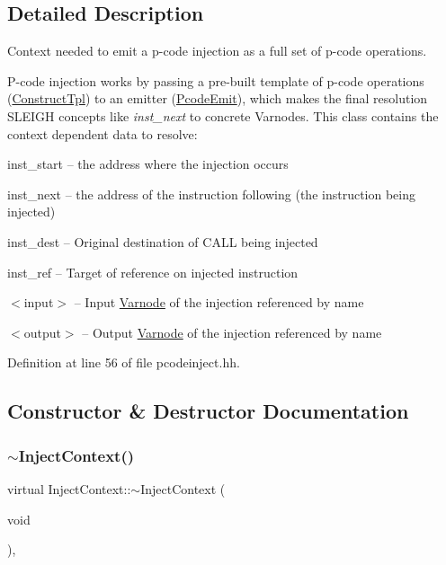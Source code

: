 \subsection{Detailed Description}
Context needed to emit a p-\/code injection as a full set of p-\/code operations. 

P-\/code injection works by passing a pre-\/built template of p-\/code operations (\mbox{\hyperlink{class_construct_tpl}{Construct\+Tpl}}) to an emitter (\mbox{\hyperlink{class_pcode_emit}{Pcode\+Emit}}), which makes the final resolution S\+L\+E\+I\+GH concepts like {\itshape inst\+\_\+next} to concrete Varnodes. This class contains the context dependent data to resolve\+:
\begin{DoxyItemize}
\item inst\+\_\+start -- the address where the injection occurs
\item inst\+\_\+next -- the address of the instruction following (the instruction being injected)
\item inst\+\_\+dest -- Original destination of C\+A\+LL being injected
\item inst\+\_\+ref -- Target of reference on injected instruction
\item $<$input$>$ -- Input \mbox{\hyperlink{class_varnode}{Varnode}} of the injection referenced by name
\item $<$output$>$ -- Output \mbox{\hyperlink{class_varnode}{Varnode}} of the injection referenced by name 
\end{DoxyItemize}

Definition at line 56 of file pcodeinject.\+hh.



\subsection{Constructor \& Destructor Documentation}
\mbox{\label{class_inject_context_a2ed6c660fb96a175c1cd21f5b6a0e0ee}} 
\subsubsection{\texorpdfstring{$\sim$InjectContext()}{~InjectContext()}}
{\footnotesize\ttfamily virtual Inject\+Context\+::$\sim$\+Inject\+Context (\begin{DoxyParamCaption}\item[{void}]{ }\end{DoxyParamCaption})\hspace{0.3cm}{\ttfamily [inline]}, {\ttfamily [virtual]}}



